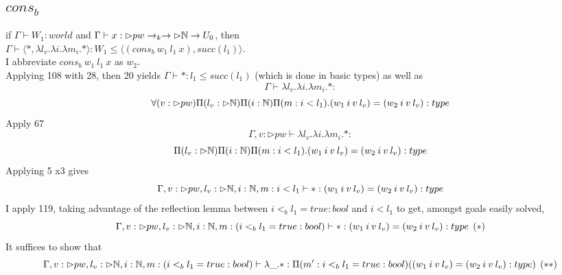 \documentclass{article}
\begin{document}
\subsection{$cons_b$}
if $\Gamma \vdash W_1 : world$ and $\Gamma \vdash x: \rhd pw \rightarrow_k \rightarrow \rhd \mathbb{N} \rightarrow U_0$, then\\ $\Gamma \vdash \langle *, \lambda l_v. \lambda i. \lambda m_i. * \rangle : W_1 \leq \langle (cons_b \:w_1 \: l_1 \:x), succ(l_1) \rangle$.\\
I abbreviate $cons_b \:w_1 \: l_1 \:x$ as $w_2$.\\
Applying 108 with 28, then 20 yields
     $\Gamma \vdash  *: l_1 \leq succ(l_1)$ (which is done in basic types) as well as 
     \[\Gamma \vdash \lambda l_v. \lambda i. \lambda m_i. * : \]
     \[\forall(v: \rhd pw)\Pi(l_v: \rhd \mathbb{N} )\Pi(i: \mathbb{N})\Pi(m: i < l_1).(w_1 \: i \: v \: l_v) = (w_2 \: i \: v \: l_v): type
     \]
     Apply 67 
      \[\Gamma, v: \rhd pw \vdash \lambda l_v. \lambda i. \lambda m_i. * : \]
     \[\Pi(l_v: \rhd \mathbb{N} )\Pi(i: \mathbb{N})\Pi(m: i < l_1).(w_1 \: i \: v \: l_v) = (w_2 \: i \: v \: l_v): type
     \]
     Applying 5 x3 gives 
       \[\Gamma, v: \rhd pw, l_v: \rhd \mathbb{N}, i: \mathbb{N}, m: i < l_1  \vdash  * :  (w_1 \: i \: v \: l_v) = (w_2 \: i \: v \: l_v): type
     \]
     I apply 119, taking advantage of the reflection lemma between $i <_b l_1 = true: bool$ and $i < l_1$ to get, amongst goals easily solved, 
      \[\Gamma, v: \rhd pw, l_v: \rhd \mathbb{N}, i: \mathbb{N}, m: (i <_b l_1 = true : bool)  \vdash  * :  (w_1 \: i \: v \: l_v) = (w_2 \: i \: v \: l_v): type \:\: (*)
     \]
     It suffices to show that
     \[\Gamma, v: \rhd pw, l_v: \rhd \mathbb{N}, i: \mathbb{N}, m: (i <_b l_1 = true : bool)  \vdash  \lambda \_.* : \Pi(m' : i <_b l_1 = true : bool)((w_1 \: i \: v \: l_v) = (w_2 \: i \: v \: l_v) : type) \: \: (**)
     \]
\end{document}
